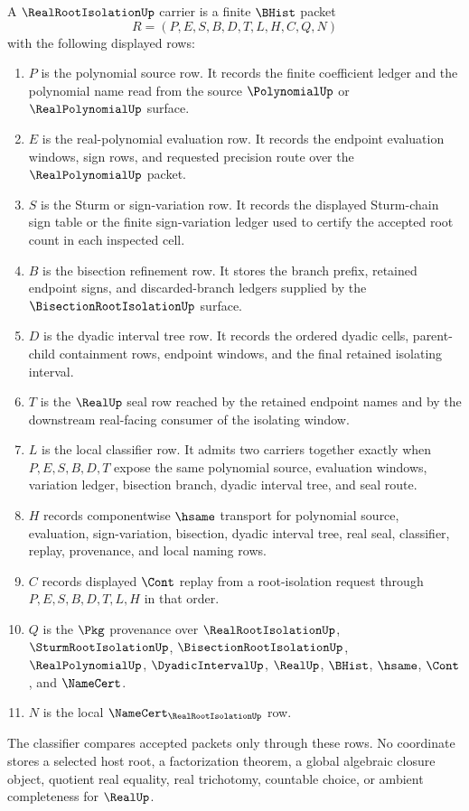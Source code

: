 \begin{definition}
\label{def:real-root-isolation-carrier}
A $\RealRootIsolationUp$ carrier is a finite $\BHist$ packet
$$
R=(P,E,S,B,D,T,L,H,C,Q,N)
$$
with the following displayed rows:
\begin{enumerate}
\item $P$ is the polynomial source row. It records the finite coefficient ledger and the polynomial name read from the source $\PolynomialUp$ or $\RealPolynomialUp$ surface.
\item $E$ is the real-polynomial evaluation row. It records the endpoint evaluation windows, sign rows, and requested precision route over the $\RealPolynomialUp$ packet.
\item $S$ is the Sturm or sign-variation row. It records the displayed Sturm-chain sign table or the finite sign-variation ledger used to certify the accepted root count in each inspected cell.
\item $B$ is the bisection refinement row. It stores the branch prefix, retained endpoint signs, and discarded-branch ledgers supplied by the $\BisectionRootIsolationUp$ surface.
\item $D$ is the dyadic interval tree row. It records the ordered dyadic cells, parent-child containment rows, endpoint windows, and the final retained isolating interval.
\item $T$ is the $\RealUp$ seal row reached by the retained endpoint names and by the downstream real-facing consumer of the isolating window.
\item $L$ is the local classifier row. It admits two carriers together exactly when $P,E,S,B,D,T$ expose the same polynomial source, evaluation windows, variation ledger, bisection branch, dyadic interval tree, and seal route.
\item $H$ records componentwise $\hsame$ transport for polynomial source, evaluation, sign-variation, bisection, dyadic interval tree, real seal, classifier, replay, provenance, and local naming rows.
\item $C$ records displayed $\Cont$ replay from a root-isolation request through $P,E,S,B,D,T,L,H$ in that order.
\item $Q$ is the $\Pkg$ provenance over $\RealRootIsolationUp$, $\SturmRootIsolationUp$, $\BisectionRootIsolationUp$, $\RealPolynomialUp$, $\DyadicIntervalUp$, $\RealUp$, $\BHist$, $\hsame$, $\Cont$, and $\NameCert$.
\item $N$ is the local $\NameCert_{\RealRootIsolationUp}$ row.
\end{enumerate}
The classifier compares accepted packets only through these rows. No coordinate stores a selected host root, a factorization theorem, a global algebraic closure object, quotient real equality, real trichotomy, countable choice, or ambient completeness for $\RealUp$.
\end{definition}

